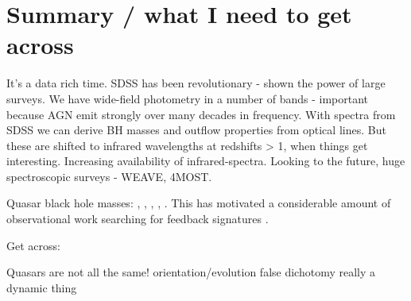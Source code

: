 \section{Summary / what I need to get across}

It's a data rich time.
SDSS has been revolutionary - shown the power of large surveys. 
We have wide-field photometry in a number of bands - important because AGN emit strongly over many decades in frequency. 
With spectra from SDSS we can derive BH masses and outflow properties from optical lines. 
But these are shifted to infrared wavelengths at redshifts > 1, when things get interesting. 
Increasing availability of infrared-spectra. 
Looking to the future, huge spectroscopic surveys - WEAVE, 4MOST. 

Quasar black hole masses: \citet{shen13}, \citet{peterson10}, \citet{peterson11}, \citet{vestergaard11}, \citet{marziani12}. 
This has motivated a considerable amount of observational work searching for feedback signatures \citep[for recent reviews, see][]{alexander12,fabian12,heckman14}. 


Get across: 

Quasars are not all the same!
orientation/evolution false dichotomy 
really a dynamic thing 






